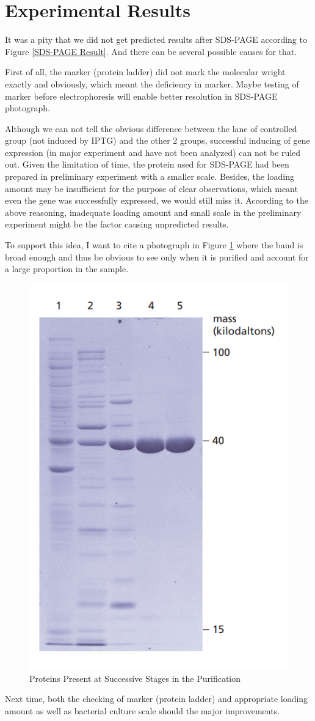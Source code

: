 \documentclass{article}
\begin{document}
\section{Experimental Results}
It was a pity that we did not get predicted results after SDS-PAGE according to Figure \ref{SDS-PAGE Result}.
And there can be several possible causes for that.

First of all, the marker (protein ladder) did not mark the molecular wright exactly and obviously, which meant the deficiency in marker.
Maybe testing of marker before electrophoresis will enable better resolution in SDS-PAGE photograph.

Although we can not tell the obvious difference between the lane of controlled group (not induced by IPTG) and the other 2 groups, successful inducing of gene expression (in major experiment and have not been analyzed) can not be ruled out.
Given the limitation of time, the protein used for SDS-PAGE had been prepared in preliminary experiment with a smaller scale.
Besides, the loading amount may be insufficient for the purpose of clear observations, which meant even the gene was successfully expressed, we would still miss it.
According to the above reasoning, inadequate loading amount and small scale in the preliminary experiment might be the factor causing unpredicted results.

To support this idea, I want to cite a photograph \cite{TheCell} in Figure \ref{Proteins Present at Successive Stages in the Purification} where the band is broad enough and thus be obvious to see only when it is purified and account for a large proportion in the sample.
\begin{figure}
    \centering
    \includegraphics[width=0.3\linewidth]{../Figures/SDS-PAGE from the cell.png}
    \caption{Proteins Present at Successive Stages in the Purification \cite{TheCell}}
    \label{Proteins Present at Successive Stages in the Purification}
\end{figure}

Next time, both the checking of marker (protein ladder) and appropriate loading amount as well as bacterial culture scale should the major improvements.





\end{document}
